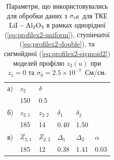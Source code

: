 \documentclass[14pt,twoside]{vakthesis}
\begin{document}
\begin{table}[tb]
	\caption{\label{tab:Liang} Параметри, що використовувались для обробки
		даних \cite{Liang1973} з $\sigma_{\rm eff}$ для ТКЕ $\rm{LiI-Al_2O_3}$
		в рамках однорідної (\ref{eq:profilex2-uniform}), ступінчатої
		(\ref{eq:profilex2-double}), та сигмойдної (\ref{eq:profilex2-sigmoid2})
		моделей профілю ${z}_2(u)$ при ${z}_1 = 0$ та
		$\sigma_0 = 2.5 \times 10^{-7}$~См/см.}
	\begin{center}
		\begin{tabular}{|l|l|l|l|l|l|}
			\hline
			а) & ${z}_2$ & $\delta$ & &  &  \\
			& 150    & 0.5   &  &  & \\
			\hline
			б)  & ${z}_{2,1}$   &${z}_{2,2}$ & $\delta_1$ & $\delta_2$ &  \\
			& 185         & 14  & 0.40       & 1.50       &  \\
			\hline
			в)  & ${Z}_{2,1}$    &${Z}_{2,2}$    & $\Delta_1$ & $\Delta_2$ &  $\alpha$ \\
			& 185         & 12        & 0.38       & 1.41       &   0.03    \\
			\hline
		\end{tabular}
	\end{center}
\end{table}
\end{document}
